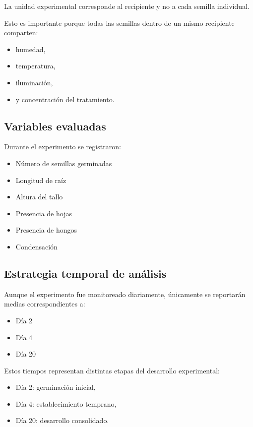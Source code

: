 La unidad experimental corresponde al recipiente y no a cada semilla individual.

Esto es importante porque todas las semillas dentro de un mismo recipiente comparten:

\begin{itemize}
    \item humedad,
    \item temperatura,
    \item iluminación,
    \item y concentración del tratamiento.
\end{itemize}

\subsection{Variables evaluadas}

Durante el experimento se registraron:

\begin{itemize}
    \item Número de semillas germinadas
    \item Longitud de raíz
    \item Altura del tallo
    \item Presencia de hojas
    \item Presencia de hongos
    \item Condensación
\end{itemize}

\subsection{Estrategia temporal de análisis}

Aunque el experimento fue monitoreado diariamente, únicamente se reportarán medias correspondientes a:

\begin{itemize}
    \item Día 2
    \item Día 4
    \item Día 20
\end{itemize}

Estos tiempos representan distintas etapas del desarrollo experimental:

\begin{itemize}
    \item Día 2: germinación inicial,
    \item Día 4: establecimiento temprano,
    \item Día 20: desarrollo consolidado.
\end{itemize}


